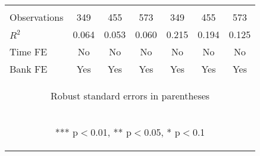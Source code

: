 \documentclass[]{article}
\begin{document}
\begin{center}
\begin{tabular}{lcccccc}
\vspace{4pt} & \begin{footnotesize}\end{footnotesize} & \begin{footnotesize}\end{footnotesize} & \begin{footnotesize}\end{footnotesize} & \begin{footnotesize}\end{footnotesize} & \begin{footnotesize}\end{footnotesize} & \begin{footnotesize}\end{footnotesize} \\
Observations & 349 & 455 & 573 & 349 & 455 & 573 \\
$R^2$ & 0.064 & 0.053 & 0.060 & 0.215 & 0.194 & 0.125 \\
Time FE & No & No & No & No & No & No \\
 Bank FE & Yes & Yes & Yes & Yes & Yes & Yes \\ \hline
\multicolumn{7}{c}{\begin{footnotesize} Robust standard errors in parentheses\end{footnotesize}} \\
\multicolumn{7}{c}{\begin{footnotesize} *** p$<$0.01, ** p$<$0.05, * p$<$0.1\end{footnotesize}} \\
\end{tabular}
\end{center}
\end{document}
